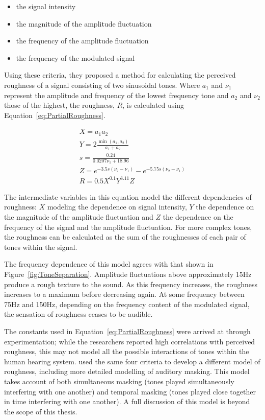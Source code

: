 		\begin{itemize}
			\item the signal intensity
			\item the magnitude of the amplitude fluctuation
			\item the frequency of the amplitude fluctuation
			\item the frequency of the modulated signal
		\end{itemize}

		Using these criteria, they proposed a method for calculating the perceived roughness of a signal consisting
		of two sinusoidal tones. Where $a_{1}$ and $\nu_{1}$ represent the amplitude and frequency of the lowest
		frequency tone and $a_{2}$ and $\nu_{2}$ those of the highest, the roughness, $R$, is calculated using
		Equation~\ref{eq:PartialRoughness}.
		
		\begin{gather}
			X = a_{1}a_{2} \nonumber \\[0.6em]
			Y = 2\frac{\min(a_{1}, a_{2})}{a_{1} + a_{2}} \nonumber \\[0.6em]
			s = \frac{0.24}{0.0207\nu_{1} + 18.96} \nonumber \\[0.6em]
			Z = e^{-3.5s(\nu_{2} - \nu_{1})} - e^{-5.75s(\nu_{2} - \nu_{1})} \nonumber \\[0.6em]
			R = 0.5X^{0.1}Y^{3.11}Z
			\label{eq:PartialRoughness}
		\end{gather}

		The intermediate variables in this equation model the different dependencies of roughness: $X$ modeling the
		dependence on signal intensity, $Y$ the dependence on the magnitude of the amplitude fluctuation and $Z$
		the dependence on the frequency of the signal and the amplitude fluctuation. For more complex tones, the
		roughness can be calculated as the sum of the roughnesses of each pair of tones within the signal. 
		
		The frequency dependence of this model agrees with that shown in Figure~\ref{fig:ToneSeparation}. Amplitude
		fluctuations above approximately 15Hz produce a rough texture to the sound. As this frequency increases,
		the roughness increases to a maximum before decreasing again. At some frequency between 75Hz and 150Hz,
		depending on the frequency content of the modulated signal, the sensation of roughness ceases to be
		audible.

		The constants used in Equation~\ref{eq:PartialRoughness} were arrived at through experimentation; while the
		researchers reported high correlations with perceived roughness, this may not model all the possible
		interactions of tones within the human hearing system. \citet{fastl2007psychoacoustics} used the same four
		criteria to develop a different model of roughness, including more detailed modelling of auditory masking.
		This model takes account of both simultaneous masking (tones played simultaneously interfering with one
		another) and temporal masking (tones played close together in time interfering with one another). A full
		discussion of this model is beyond the scope of this thesis.


